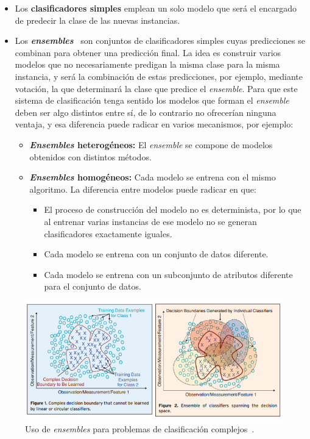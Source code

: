 \begin{itemize}
	\item Los \textbf{clasificadores simples} emplean un solo modelo que será el encargado de predecir la clase de las nuevas instancias. 
	\item Los \textbf{\textit{ensembles}}~\cite{kuncheva2004combining} son conjuntos de clasificadores simples cuyas predicciones se combinan para obtener una predicción final. La idea es construir varios modelos que no necesariamente predigan la misma clase para la misma instancia, y será la combinación de estas predicciones, por ejemplo, mediante votación, la que determinará la clase que predice el \textit{ensemble}. Para que este sistema de clasificación tenga sentido los modelos que forman el \textit{ensemble} deben ser algo distintos entre sí, de lo contrario no ofrecerían ninguna ventaja, y esa diferencia puede radicar en varios mecanismos, por ejemplo: 
	\begin{itemize}
		\item \textbf{\textit{Ensembles} heterogéneos:} El \textit{ensemble} se compone de modelos obtenidos con distintos métodos. 
		\item \textbf{\textit{Ensembles} homogéneos:} Cada modelo se entrena con el mismo algoritmo. La diferencia entre modelos puede radicar en que: 
		\begin{itemize}
			\item El proceso de construcción del modelo no es determinista, por lo que al entrenar varias instancias de ese modelo no se generan clasificadores exactamente iguales. 
			\item Cada modelo se entrena con un conjunto de datos diferente.
			\item Cada modelo se entrena con un subconjunto de atributos diferente para el conjunto de datos. 
		\end{itemize}
	\end{itemize}
\end{itemize} 

\begin{figure}
	\centering
	\includegraphics[width=1\textwidth]{../img/ensembles.png}
	\caption[Uso de \textit{ensembles} para problemas de clasificación complejos.]{Uso de \textit{ensembles} para problemas de clasificación complejos~\cite{polikar2006ensemble}.}
	\label{fig:ensemble}
\end{figure}

